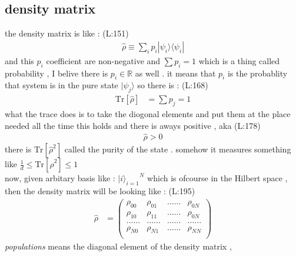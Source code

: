 \subsection{density matrix}
 the density matrix is like : 
(L:151)
\begin{equation}
\begin{split}
\hat{\rho }\equiv \sum _{i }p _{i }|\psi _{i }\rangle \langle \psi _{i }|\end{split}
\end{equation}
 and this 
 $ p _{i } $  coefficient are non-negative and
 $ \sum p _{i }=1 $  which is a thing called probability , I belive there is 
 $ p _{i }\in \mathds{R } $  as well .
 it means that
 $ p _{i } $  is the probablity that system is in the pure state 
 $ |\psi _{j }\rangle  $  so there is : 
(L:168)
\begin{equation}
\begin{split}
\text{Tr}\left[\hat{\rho }\right]&=\sum p _{j }=1\end{split}
\end{equation}
 what the trace does is to take the diogonal elements and
 put them at the place needed
 all the time this holds
 and there is aways positive , aka
(L:178)
\begin{equation}
\begin{split}
\hat{\rho }>0\end{split}
\end{equation}
 there is 
 $ \text{Tr}\left[\hat{\rho }^{2}\right] $  called the purity of the state . 
 somehow it measures something like 
 $ \frac{1}{d }\leq \text{Tr}\left[\hat{\rho }^{2}\right]\leq 1 $ \\
 now, given arbitary basis like : 
 $ {|i \rangle _{i =1}}^{N } $  which is ofcourse in the Hilbert space , then 
 the density matrix will be looking like : 
(L:195)
\begin{equation}
\begin{split}
\hat{\rho }&=\begin{pmatrix} 
\rho _{00}&\rho _{01}&......&\rho _{0N }\\
\rho _{10}&\rho _{11}&......&\rho _{0N }\\
......&......&......&......\\
\rho _{N 0}&\rho _{N 1}&......&\rho _{N N }\\
\end{pmatrix} 
\end{split}
\end{equation}
\textit{populations}
 means the diagonal element of the density matrix , 
